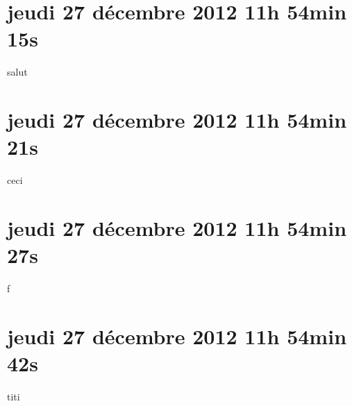 
\section{jeudi 27 décembre 2012 11h 54min 15s}

salut

\section{jeudi 27 décembre 2012 11h 54min 21s}

ceci

\section{jeudi 27 décembre 2012 11h 54min 27s}

f

\section{jeudi 27 décembre 2012 11h 54min 42s}

titi
